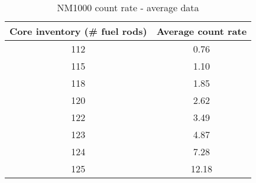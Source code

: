 \begin{landscape}
\begin{table}[!htb]
    \centering
\begin{tabular}{cc}
Core inventory (\# fuel rods) & Average count rate \\ \hline\hline
112 & 0.76  \\
115 & 1.10  \\
118 & 1.85  \\
120 & 2.62  \\
122 & 3.49  \\
123 & 4.87  \\
124 & 7.28  \\
125 & 12.18
\end{tabular}
        \caption{NM1000 count rate - average data}\label{tab:nm1000_avg}
\end{table}
\end{landscape}



\
